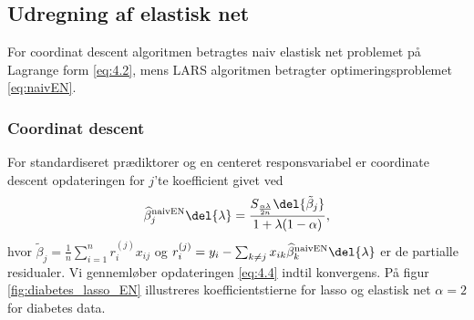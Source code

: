 %
\subsection{Udregning af elastisk net}
For coordinat descent algoritmen betragtes naiv elastisk net problemet på Lagrange form \eqref{eq:4.2}, mens LARS algoritmen betragter optimeringsproblemet \eqref{eq:naivEN}.
%
\subsubsection{Coordinat descent}
For standardiseret prædiktorer og en centeret responsvariabel er coordinate descent opdateringen for $j$'te koefficient givet ved
\begin{align}
\widehat{\beta}^\text{naivEN}_j \del{\lambda}= \frac{S_{\frac{\alpha \lambda}{2n}} \del{\tilde{\beta}_j}}{1 + \lambda (1-\alpha)}, \label{eq:4.4}
\end{align}
hvor \(\tilde{\beta}_j = \frac{1}{n} \sum_{i=1}^n r_{i}^{(j)} x_{ij}\) og \(r_{i}^{(j)} = y_i - \sum_{k \neq j} x_{ik} \widehat{\beta}^\text{naivEN}_k \del{\lambda}\) er de partialle residualer.
Vi gennemløber opdateringen \eqref{eq:4.4} indtil konvergens.
%
På figur \ref{fig:diabetes_lasso_EN} illustreres koefficientstierne for lasso og elastisk net \(\alpha = 2\) for diabetes data.

